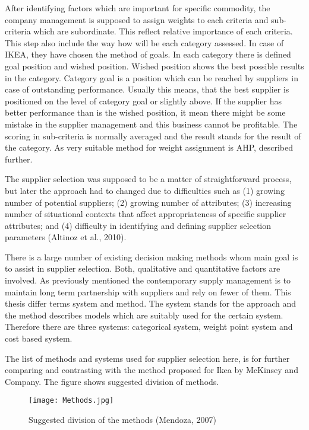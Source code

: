 \documentclass[oneside,12pt]{article}%
\begin{document}
After identifying factors which are important for specific commodity, the company management is supposed to assign weights to each criteria and sub-criteria which are subordinate. This reflect relative importance of each criteria. This step also include the way how will be each category assessed. In case of IKEA, they have chosen the method of goals. In each category there is defined goal position and wished position. Wished position shows the best possible results in the category. Category goal is a position which can be reached by suppliers in case of outstanding performance. Usually this means, that the best supplier is positioned on the level of category goal or slightly above. If the supplier has better performance than is the wished position, it mean there might be some mistake in the supplier management and this business cannot be profitable. The scoring in sub-criteria is normally averaged and the result stands for the result of the category. As very suitable method for weight assignment is AHP, described further.


The supplier selection was supposed to be a matter of straightforward process, but later the approach had to changed due to difficulties such as (1) growing number of potential suppliers; (2) growing number of attributes; (3) increasing number of situational contexts that affect appropriateness of specific supplier attributes; and (4) difficulty in identifying and defining supplier selection parameters (Altinoz et al., 2010). \par
There is a large number of existing decision making methods whom main goal is to assist in supplier selection. Both, qualitative and quantitative factors are involved. As previously mentioned the contemporary supply management is to maintain long term partnership with suppliers and rely on fewer of them. This thesis differ terms system and method. The system stands for the approach and the method describes models which are suitably used for the certain system. Therefore there are three systems: categorical system, weight point system and cost based system. \par
The list of methods and systems used for supplier selection here, is for further comparing and contrasting with the method proposed for Ikea by McKinsey and Company. The figure shows suggested division of methods.



\begin{figure}[ht!]
  \texttt{[image: Methods.jpg]}
  \caption{Suggested division of the methods (Mendoza, 2007)}
\end{figure}
\end{document}
